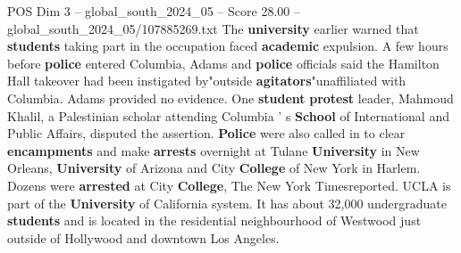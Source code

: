 \begin{textsample}{POS Dim 3 – global\_south\_2024\_05 – Score 28.00 – global\_south\_2024\_05/107885269.txt}
The \textbf{university} earlier warned that \textbf{students} taking part in the occupation faced \textbf{academic} expulsion.
A few hours before \textbf{police} entered Columbia, Adams and \textbf{police} officials said the Hamilton Hall takeover had been instigated by"outside \textbf{agitators}"unaffiliated with Columbia.
Adams provided no evidence.
One \textbf{student} \textbf{protest} leader, Mahmoud Khalil, a Palestinian scholar attending Columbia ' s \textbf{School} of International and Public Affairs, disputed the assertion. \textbf{Police} were also called in to clear \textbf{encampments} and make \textbf{arrests} overnight at Tulane \textbf{University} in New Orleans, \textbf{University} of Arizona and City \textbf{College} of New York in Harlem.
Dozens were \textbf{arrested} at City \textbf{College}, The New York Timesreported.
UCLA is part of the \textbf{University} of California system.
It has about 32,000 undergraduate \textbf{students} and is located in the residential neighbourhood of Westwood just outside of Hollywood and downtown Los Angeles.

\end{textsample}
